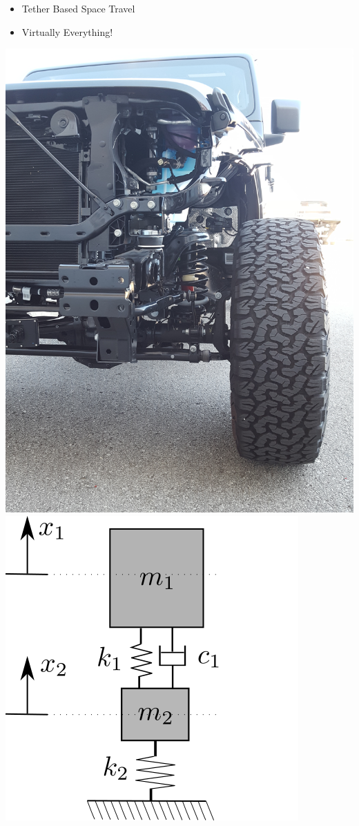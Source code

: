 \documentclass[11pt]{article}
\begin{document}
\begin{itemize}
\begin{itemize}
		\item Tether Based Space Travel

		\item Virtually Everything!

	\end{itemize}

\includegraphics[scale=.05,angle=-90,origin=c]{jeep_01.jpg} \hspace{10mm}  \includegraphics[scale=.5]{mass_spring_2dof.png}\\


\end{itemize}
\end{document}
